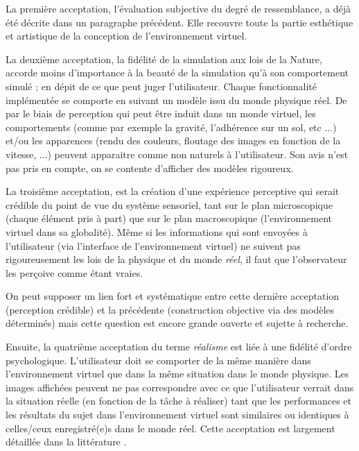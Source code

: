 	\par La première acceptation, l'évaluation subjective du degré de ressemblance, a déjà été décrite dans un paragraphe précédent. Elle recouvre toute la partie esthétique et artistique de la conception de l'environnement virtuel.
	
	\par La deuxième acceptation, la fidélité de la simulation aux lois de la Nature, accorde moins d'importance à la beauté de la simulation qu'à son comportement simulé ; en dépit de ce que peut juger l'utilisateur. Chaque fonctionnalité implémentée se comporte en suivant un modèle issu du monde physique réel. De par le biais de perception qui peut être induit dans un monde virtuel, les comportements (comme par exemple la gravité, l'adhérence sur un sol, etc ...) et/ou les apparences (rendu des couleurs, floutage des images en fonction de la vitesse, ...) peuvent apparaitre comme non naturels à l'utilisateur. Son avis n'est pas pris en compte, on se contente d'afficher des modèles rigoureux.
	
	\par La troisième acceptation, est la création d'une expérience perceptive qui serait crédible du point de vue du système sensoriel, tant sur le plan microscopique (chaque élément pris à part) que sur le plan macroscopique (l'environnement virtuel dans sa globalité). Même si les informations qui sont envoyées à l'utilisateur (via l'interface de l'environnement virtuel) ne suivent pas rigoureusement les lois de la physique et du monde \textit{réel}, il faut que l'observateur les perçoive comme étant vraies.
	
	\par On peut supposer un lien fort et systématique entre cette dernière acceptation (perception crédible) et la précédente (construction objective via des modèles déterminés) mais cette question est encore grande ouverte et sujette à recherche.
	
	\par Ensuite, la quatrième acceptation du terme \textit{réalisme} est liée à une fidélité d'ordre psychologique. L'utilisateur doit se comporter de la même manière dans l'environnement virtuel que dans la même situation dans le monde physique. Les images affichées peuvent ne pas correspondre avec ce que l'utilisateur verrait dans la situation réelle (en fonction de la tâche à réaliser) tant que les performances et les résultats du sujet dans l'environnement virtuel sont similaires ou identiques à celles/ceux enregistré(e)s dans le monde réel. Cette acceptation est largement détaillée dans la littérature \citep{patrick_training:_1992,stoffregen_one_2003,burkhardt_realite_2003}.
	
